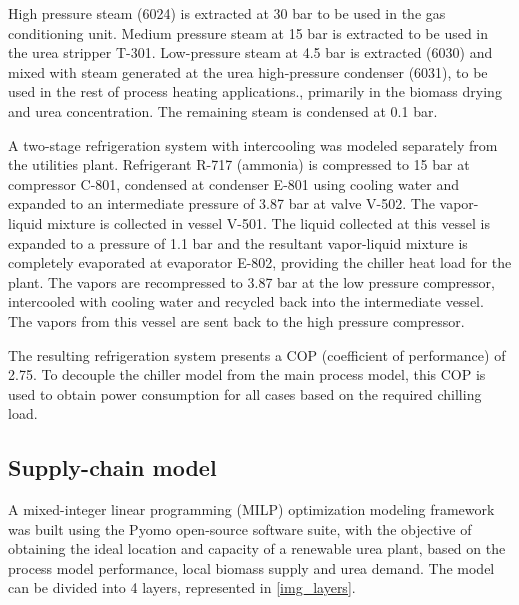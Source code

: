\documentclass[a4paper, titlepage]{article}
\begin{document}
High pressure steam (6024) is extracted at 30 bar to be used in the gas conditioning unit. Medium pressure steam at 
15 bar is extracted to be used in the urea stripper T-301. Low-pressure steam at 4.5 bar is extracted (6030) and mixed 
with steam generated at the urea high-pressure condenser (6031), to be used in the rest of process heating 
applications., primarily in the biomass drying and urea concentration. The remaining steam is condensed at 0.1 bar.  

A two-stage refrigeration system with intercooling \cite{stoeckerIndustrialRefrigerationHandbook2004} was modeled 
separately from the utilities plant. Refrigerant R-717 (ammonia) is compressed to 15 bar at compressor C-801, 
condensed at condenser E-801 using cooling water and expanded to an intermediate pressure of 3.87 bar at valve V-502. 
The vapor-liquid mixture is collected in vessel V-501. The liquid collected at this vessel is expanded to a pressure
of 1.1 bar and the resultant vapor-liquid mixture is completely evaporated at evaporator E-802, providing the chiller
heat load for the plant. The vapors are recompressed to 3.87 bar at the low pressure compressor, intercooled with 
cooling water and recycled back into the intermediate vessel. The vapors from this vessel are sent back to the 
high pressure compressor.

The resulting refrigeration system presents a COP (coefficient of performance) of 2.75. To decouple the chiller model
from the main process model, this COP is used to obtain power consumption for all cases based on the required chilling
load.


\subsection{Supply-chain model}

A mixed-integer linear programming (MILP) optimization modeling framework was built using the Pyomo open-source
software suite, with the objective of obtaining the ideal location and capacity of a renewable urea plant,
based on the process model performance, local biomass supply and urea demand. The model can be divided into 4 layers,
represented in \autoref{img_layers}.
\end{document}
